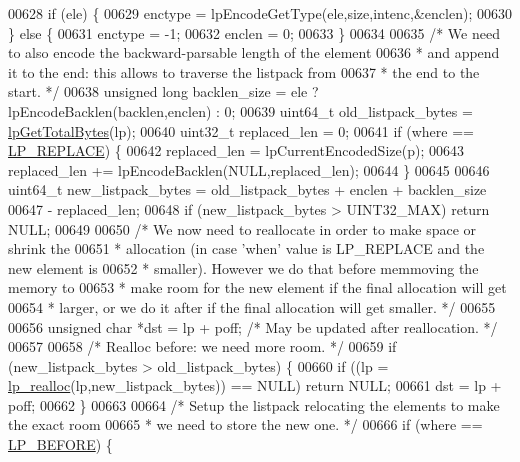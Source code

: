 \begin{DoxyCode}
{00628     \textcolor{keywordflow}{if} (ele) \{
00629         enctype = lpEncodeGetType(ele,size,intenc,&enclen);
00630     \} \textcolor{keywordflow}{else} \{
00631         enctype = -1;
00632         enclen = 0;
00633     \}
00634 
00635     \textcolor{comment}{/* We need to also encode the backward-parsable length of the element}
00636 \textcolor{comment}{     * and append it to the end: this allows to traverse the listpack from}
00637 \textcolor{comment}{     * the end to the start. */}
00638     \textcolor{keywordtype}{unsigned} \textcolor{keywordtype}{long} backlen\_size = ele ? lpEncodeBacklen(backlen,enclen) : 0;
00639     uint64\_t old\_listpack\_bytes = \hyperlink{listpack_8c_a18d79dc11f1002b8c367eab243912a36}{lpGetTotalBytes}(lp);
00640     uint32\_t replaced\_len  = 0;
00641     \textcolor{keywordflow}{if} (where == \hyperlink{listpack_8h_a29d3b9a55d47053582a5025dd85d7fe6}{LP\_REPLACE}) \{
00642         replaced\_len = lpCurrentEncodedSize(p);
00643         replaced\_len += lpEncodeBacklen(NULL,replaced\_len);
00644     \}
00645 
00646     uint64\_t new\_listpack\_bytes = old\_listpack\_bytes + enclen + backlen\_size
00647                                   - replaced\_len;
00648     \textcolor{keywordflow}{if} (new\_listpack\_bytes > UINT32\_MAX) \textcolor{keywordflow}{return} NULL;
00649 
00650     \textcolor{comment}{/* We now need to reallocate in order to make space or shrink the}
00651 \textcolor{comment}{     * allocation (in case 'when' value is LP\_REPLACE and the new element is}
00652 \textcolor{comment}{     * smaller). However we do that before memmoving the memory to}
00653 \textcolor{comment}{     * make room for the new element if the final allocation will get}
00654 \textcolor{comment}{     * larger, or we do it after if the final allocation will get smaller. */}
00655 
00656     \textcolor{keywordtype}{unsigned} \textcolor{keywordtype}{char} *dst = lp + poff; \textcolor{comment}{/* May be updated after reallocation. */}
00657 
00658     \textcolor{comment}{/* Realloc before: we need more room. */}
00659     \textcolor{keywordflow}{if} (new\_listpack\_bytes > old\_listpack\_bytes) \{
00660         \textcolor{keywordflow}{if} ((lp = \hyperlink{listpack__malloc_8h_acb3fca076ed1f5c6437b4e13462bb716}{lp\_realloc}(lp,new\_listpack\_bytes)) == NULL) \textcolor{keywordflow}{return} NULL;
00661         dst = lp + poff;
00662     \}
00663 
00664     \textcolor{comment}{/* Setup the listpack relocating the elements to make the exact room}
00665 \textcolor{comment}{     * we need to store the new one. */}
00666     \textcolor{keywordflow}{if} (where == \hyperlink{listpack_8h_a64de9ded0fe5ccb80bc2bc9fb8c6c3b2}{LP\_BEFORE}) \{
}
\end{DoxyCode}
